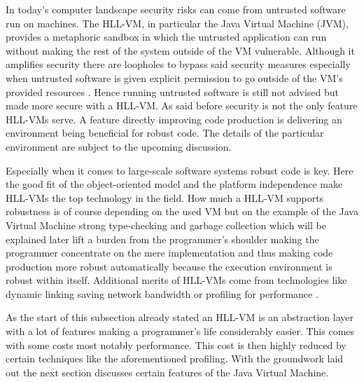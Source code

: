 In today's computer landscape security risks can come from untrusted software run on machines. The HLL-VM, in particular the Java Virtual Machine (JVM),  provides a metaphoric sandbox in which the untrusted application can run without making the rest of the system outside of the VM vulnerable. Although it amplifies security there are loopholes to bypass said security measures especially when untrusted software is given explicit permission to go outside of the VM's provided resources \cite{Smith, Lindholm}. Hence running untrusted software is still not advised but made more secure with a HLL-VM. As said before security is not the only feature HLL-VMs serve. A feature directly improving code production is delivering an environment being beneficial for robust code. The details of the particular environment are subject to the upcoming discussion.

Especially when it comes to large-scale software systems robust code is key. Here the good fit of the object-oriented model and the platform independence make HLL-VMs the top technology in the field. How much a HLL-VM supports robustness is of course depending on the used VM but on the example of the Java Virtual Machine strong type-checking and garbage collection which will be explained later lift a burden from the programmer's shoulder making the programmer concentrate on the mere implementation and thus making code production more robust automatically because the execution environment is robust within itself. Additional merits of HLL-VMs come from technologies like dynamic linking saving network bandwidth or profiling for performance \cite{Smith}.

As the start of this subsection already stated an HLL-VM is an abstraction layer with a lot of features making a programmer's life considerably easier. This comes with some costs most notably performance. This cost is then highly reduced by certain techniques like the aforementioned profiling. With the groundwork laid out the next section discusses certain features of the Java Virtual Machine.

